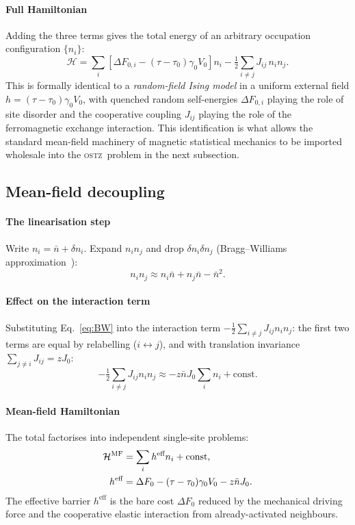\documentclass[3p]{elsarticle}
\newcommand{\OSTZ}{\textsc{ostz}}
\newcommand{\dF}{\Delta F_0}
\newcommand{\gz}{\gamma_0}
\newcommand{\half}{\tfrac{1}{2}}
\begin{document}
\paragraph{Full Hamiltonian}
Adding the three terms gives the total energy of an arbitrary
occupation configuration $\{n_i\}$:
\begin{equation}
  \mathcal H=\sum_i\!\left[\Delta F_{0,i}-(\tau-\tau_0)\gz V_0\right]n_i
  -\half\sum_{i\ne j}J_{ij}\,n_in_j.
  \label{eq:Hamiltonian}
\end{equation}
This is formally identical to a \emph{random-field Ising model} in a
uniform external field $h=(\tau-\tau_0)\gz V_0$, with quenched random
self-energies $\Delta F_{0,i}$ playing the role of site disorder and
the cooperative coupling $J_{ij}$ playing the role of the
ferromagnetic exchange interaction. This identification is what
allows the standard mean-field machinery of magnetic statistical
mechanics to be imported wholesale into the \OSTZ\ problem in the
next subsection.

\subsection{Mean-field decoupling}
\label{sec:MF}

\paragraph{The linearisation step}
Write $n_i=\bar n+\delta n_i$. Expand $n_in_j$ and drop
$\delta n_i\delta n_j$ (Bragg--Williams approximation~\citep{bragg1934}):
\begin{equation}
  n_in_j\approx n_i\bar n+n_j\bar n-\bar n^2.
  \label{eq:BW}
\end{equation}

\paragraph{Effect on the interaction term}
Substituting Eq.~\eqref{eq:BW} into the interaction term
$-\half\sum_{i\ne j}J_{ij}n_in_j$: the first two
terms are equal by relabelling ($i\leftrightarrow j$), and with
translation invariance $\sum_{j\ne i}J_{ij}=zJ_0$:
\begin{equation}
  -\half\sum_{i\ne j}J_{ij}n_in_j\approx
  -z\bar nJ_0\sum_i n_i+\text{const.}
  \label{eq:MFinteraction}
\end{equation}

\paragraph{Mean-field Hamiltonian}
The total factorises into independent single-site problems:
\begin{align}
  \mathcal H^\text{MF}&=\sum_i h^\text{eff}n_i+\text{const},
    \label{eq:heff}\\
  h^\text{eff}&=\dF-(\tau-\tau_0)\gz V_0-z\bar nJ_0.\notag
\end{align}
The effective barrier $h^\text{eff}$ is the bare cost $\dF$ reduced
by the mechanical driving force and the cooperative elastic
interaction from already-activated neighbours.
\end{document}
